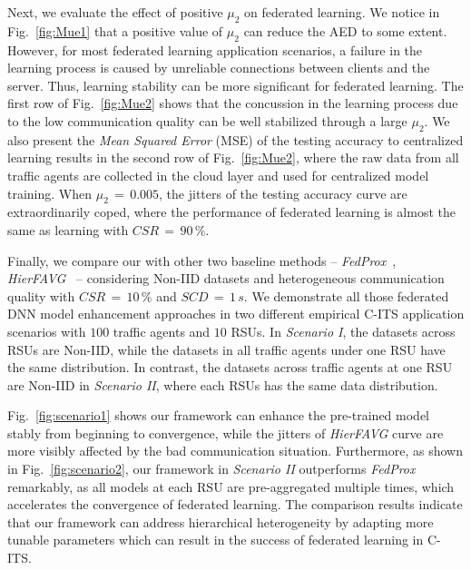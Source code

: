 Next, we evaluate the effect of positive $\mu_2$ on federated learning. We notice in Fig.~\ref{fig:Mue1} that a positive value of $\mu_2$ can reduce the AED to some extent. However, for most federated learning application scenarios, a failure in the learning process is caused by unreliable connections between clients and the server. Thus, learning stability can be more significant for federated learning. The first row of Fig.~\ref{fig:Mue2} shows that the concussion in the learning process due to the low communication quality can be well stabilized through a large $\mu_2$. We also present the \emph{Mean Squared Error} (MSE) of the testing accuracy to centralized learning results in the second row of Fig.~\ref{fig:Mue2}, where the raw data from all traffic agents are collected in the cloud layer and used for centralized model training. When $\mu_2\,=\,0.005$, the jitters of the testing accuracy curve are extraordinarily coped, where the performance of federated learning is almost the same as learning with $CSR\,=\,90\,\%$. 

Finally, we compare our {\myHFed} with other two baseline methods --  \emph{FedProx}~\cite{li2020federated}, \emph{HierFAVG}~\cite{9148862} -- considering Non-IID datasets and heterogeneous communication quality with $CSR\,=\,10\,\%$ and $SCD\,=\,1\,s$. We demonstrate all those federated DNN model enhancement approaches in two different empirical C-ITS application scenarios with $100$ traffic agents and $10$ RSUs. In \emph{Scenario I}, the datasets across RSUs are Non-IID, while the datasets in all traffic agents under one RSU have the same distribution. In contrast, the datasets across traffic agents at one RSU are Non-IID in \emph{Scenario II}, where each RSUs has the same data distribution. 

Fig.~\ref{fig:scenario1} shows our framework {\myHFed} can enhance the pre-trained model stably from beginning to convergence, while the jitters of \emph{HierFAVG} curve are more visibly affected by the bad communication situation. Furthermore, as shown in Fig.~\ref{fig:scenario2}, our framework {\myHFed} in \emph{Scenario II} outperforms \emph{FedProx} remarkably, as all models at each RSU are pre-aggregated multiple times, which accelerates the convergence of federated learning. The comparison results indicate that our framework can address hierarchical heterogeneity by adapting more tunable parameters which can result in the success of federated learning in C-ITS. 

